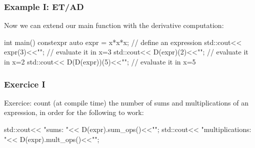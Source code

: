 \documentclass[aspectratio=43]{beamer}
\begin{document}

\begin{frame}[fragile]\frametitle{Example I: ET/AD}
  Now we can extend our main function with the derivative computation:
  \begin{Cpplisting}{}
int main(){
  constexpr auto expr = x*x*x; // define an expression
  std::cout<< expr(3)<<"\n"; // evaluate it in x=3
  std::cout<< D(expr)(2)<<"\n"; // evaluate it in x=2
  std::cout<< D(D(expr))(5)<<"\n"; // evaluate it in x=5
}
  \end{Cpplisting}
\end{frame}

\begin{frame}[fragile]\frametitle{Exercice I}
  Exercice: count (at compile time) the number of sums and multiplications of an expression,
  in order for the following to work:

  \begin{Cpplisting}[: Exercice I]{}
std::cout<< "sums: "<< D(expr).sum_ops()<<"\n";
std::cout<< "multiplications: "<< D(expr).mult_ops()<<"\n";
  \end{Cpplisting}
\end{frame}
\end{document}
